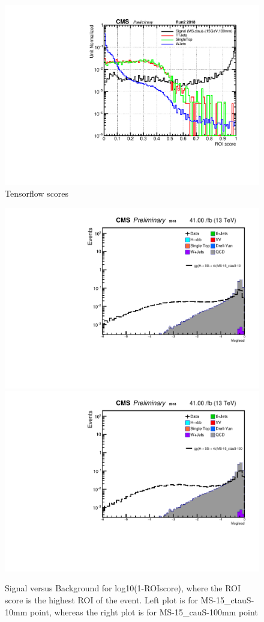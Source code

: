 \begin{figure}[h!]
  \caption{Tensorflow scores}
  \label{fig:TensorFlow scores}
  \centering
  \includegraphics[width=0.67\linewidth]{figs/Tensorflow_Disc_mostrecent.pdf}

\end{figure}

 \begin{figure}[h!]
   \caption{Signal versus Background for log10(1-ROIscore), where the ROI score is the highest ROI of the event. Left plot is for MS-15\_ctauS-10mm point, whereas the right plot is for MS-15\_cauS-100mm point}
   \label{fig:leadROIscore}
   \centering
   \includegraphics[width=0.47\linewidth]{figs/AnalysisNoteplot_MS-15_ctauS-10_hloglead.pdf}
   \includegraphics[width=0.47\linewidth]{figs/AnalysisNoteplot_MS-15_ctauS-100_hloglead.pdf}
 \end{figure}


